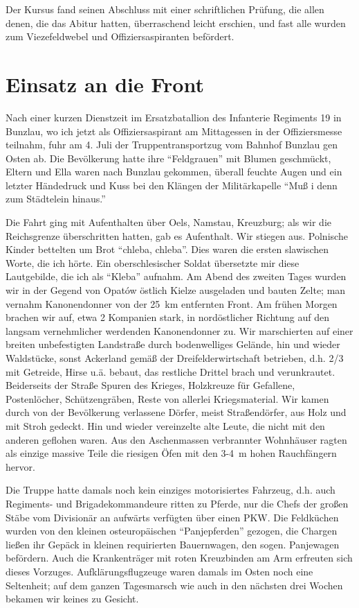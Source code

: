 Der Kursus fand seinen Abschluss mit einer schriftlichen Prüfung, die allen denen, die das Abitur hatten, überraschend leicht erschien, und fast alle wurden zum Viezefeldwebel und Offiziersaspiranten befördert.


\section{Einsatz an die Front}
Nach einer kurzen Dienstzeit im Ersatzbatallion des Infanterie Regiments 19 in Bunzlau, wo ich jetzt als Offiziersaspirant am Mittagessen in der Offiziersmesse teilnahm, fuhr am 4. Juli der Truppentransportzug vom Bahnhof Bunzlau gen Osten ab. Die Bevölkerung hatte ihre \enquote{Feldgrauen} mit Blumen geschmückt, Eltern und Ella waren nach Bunzlau gekommen, überall feuchte Augen und ein letzter Händedruck und Kuss bei den Klängen der Militärkapelle \enquote{Muß i denn zum Städtelein hinaus.}

Die Fahrt ging mit Aufenthalten über Oels, Namstau, Kreuzburg; als wir die Reichsgrenze überschritten hatten, gab es Aufenthalt. Wir stiegen aus. Polnische Kinder bettelten um Brot \enquote{chleba, chleba}. Dies waren die ersten slawischen Worte, die ich hörte. Ein oberschlesischer Soldat übersetzte mir diese Lautgebilde, die ich als \enquote{Kleba} aufnahm. Am Abend des zweiten Tages wurden wir in der Gegend von Opatów östlich Kielze ausgeladen und bauten Zelte; man vernahm Kanonendonner von der 25~km entfernten Front. Am frühen Morgen brachen wir auf, etwa 2 Kompanien stark, in nordöstlicher Richtung auf den langsam vernehmlicher werdenden Kanonendonner zu. Wir marschierten auf einer breiten unbefestigten Landstraße durch bodenwelliges Gelände, hin und wieder Waldstücke, sonst Ackerland gemäß der Dreifelderwirtschaft betrieben, d.h. 2/3 mit Getreide, Hirse u.ä. bebaut, das restliche Drittel brach und verunkrautet. Beiderseits der Straße Spuren des Krieges, Holzkreuze für Gefallene, Postenlöcher, Schützengräben, Reste von allerlei Kriegsmaterial. Wir kamen durch von der Bevölkerung verlassene Dörfer, meist Straßendörfer, aus Holz und mit Stroh gedeckt. Hin und wieder vereinzelte alte Leute, die nicht mit den anderen geflohen waren. Aus den Aschenmassen verbrannter Wohnhäuser ragten als einzige massive Teile die riesigen Öfen mit den 3-4~m hohen Rauchfängern hervor.

Die Truppe hatte damals noch kein einziges motorisiertes Fahrzeug, d.h. auch Regiments- und Brigadekommandeure ritten zu Pferde, nur die Chefs der großen Stäbe vom Divisionär an aufwärts verfügten über einen PKW. Die Feldküchen wurden von den kleinen osteuropäischen \enquote{Panjepferden} gezogen, die Chargen ließen ihr Gepäck in kleinen requirierten Bauernwagen, den sogen. Panjewagen befördern. Auch die Krankenträger mit roten Kreuzbinden am Arm erfreuten sich dieses Vorzuges. Aufklärungsflugzeuge waren damals im Osten noch eine Seltenheit; auf dem ganzen Tagesmarsch wie auch in den nächsten drei Wochen bekamen wir keines zu Gesicht.

